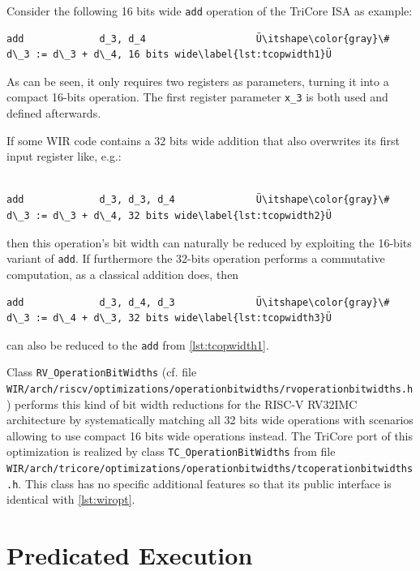 \begin{wirExample}\label{ex:opwidth1}
Consider the following 16 bits wide \texttt{add} operation of the TriCore \gls{ISA} as example:
\begin{lstlisting}[style=code]
        add             d_3, d_4                   Ü\itshape\color{gray}\# d\_3 := d\_3 + d\_4, 16 bits wide\label{lst:tcopwidth1}Ü
\end{lstlisting}
As can be seen, it only requires two registers as parameters, turning it into a compact 16-bits operation.
The first register parameter \texttt{x\_3} is both used and defined afterwards.

If some \gls{WIR} code contains a 32 bits wide addition that also overwrites its first input register like, e.g.: \\
\\
\begin{lstlisting}[style=code,firstnumber=2]
        add             d_3, d_3, d_4              Ü\itshape\color{gray}\# d\_3 := d\_3 + d\_4, 32 bits wide\label{lst:tcopwidth2}Ü
\end{lstlisting}
then this operation's bit width can naturally be reduced by exploiting the 16-bits variant of \texttt{add}.
If furthermore the 32-bits operation performs a commutative computation, as a classical addition does, then
\begin{lstlisting}[style=code,firstnumber=3]
        add             d_3, d_4, d_3              Ü\itshape\color{gray}\# d\_3 := d\_4 + d\_3, 32 bits wide\label{lst:tcopwidth3}Ü
\end{lstlisting}
can also be reduced to the \texttt{add} from \cref{lst:tcopwidth1}.
\end{wirExample}

Class \texttt{RV\_OperationBitWidths} (cf. file \texttt{WIR/arch/riscv/optimizations/operationbitwidths/rvoper\-ationbitwidths.h}) performs this kind of bit width reductions for the RISC-V RV32IMC architecture by systematically matching all 32 bits wide operations with scenarios allowing to use compact 16 bits wide operations instead.
The TriCore port of this optimization is realized by class \texttt{TC\_OperationBitWidths} from file \texttt{WIR/arch/tricore/optimizations/operationbitwidths/tc\-operationbitwidths.h}.
This class has no specific additional features so that its public interface is identical with \cref{lst:wiropt}.


\section{Predicated Execution}
\label{sec:optpredex}

